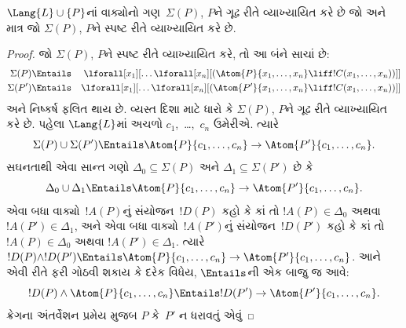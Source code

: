 \begin{thm}[બેથનું વ્યાખ્યેયતા પ્રમેય]
$\Lang{L}\cup\{P\}$નાં વાક્યોનો ગણ~$\Sigma(P)$, $P$ને ગૂઢ
રીતે વ્યાખ્યાયિત કરે છે જો અને માત્ર જો $\Sigma(P)$, $P$ને સ્પષ્ટ
રીતે વ્યાખ્યાયિત કરે છે.
\end{thm}

\begin{proof}
જો $\Sigma(P)$, $P$ને સ્પષ્ટ રીતે વ્યાખ્યાયિત કરે, તો આ બંને સાચાં
છે:
\begin{align*}
  \Sigma(P) & \Entails & \lforall[x_1][\dots \lforall[x_n]
    [(\Atom{P}{x_1,\dots, x_n} \liff !C(x_1,\dots,x_n))]]\\
  \Sigma(P') & \Entails & \lforall[x_1][\dots \lforall[x_n]
    [(\Atom{P'}{x_1,\dots, x_n} \liff !C(x_1,\dots,x_n))]]
\end{align*}
અને નિષ્કર્ષ ફલિત થાય છે. વ્યસ્ત દિશા માટે ધારો કે $\Sigma(P)$,
$P$ને ગૂઢ રીતે વ્યાખ્યાયિત કરે છે. પહેલા $\Lang{L}$માં અચળો
$c_1$,~\dots,~$c_n$ ઉમેરીએ. ત્યારે
\[
\Sigma(P) \cup \Sigma(P') \Entails
\Atom{P}{c_1, \dots, c_n} \to \Atom{P'}{c_1, \dots, c_n}.
\]
સઘનતાથી એવા સાન્ત ગણો $\Delta_0\subseteq\Sigma(P)$ અને
$\Delta_1\subseteq\Sigma(P')$ છે કે
\[
\Delta_0 \cup \Delta_1 \Entails
\Atom{P}{c_1, \dots, c_n} \to \Atom{P'}{c_1, \dots, c_n}.
\]
એવા બધા વાક્યો~$!A(P)$નું સંયોજન~$!D(P)$ કહો કે કાં તો
$!A(P)\in\Delta_0$ અથવા $!A(P')\in\Delta_1$, અને એવા બધા
વાક્યો~$!A(P')$નું સંયોજન~$!D(P')$ કહો કે કાં તો
$!A(P)\in\Delta_0$ અથવા $!A(P')\in\Delta_1$. ત્યારે
$!D(P)\land !D(P')\Entails\Atom{P}{c_1,\dots,c_n}\to
\Atom{P'}{c_1,\dots,c_n}$. આને એવી રીતે ફરી ગોઠવી શકાય કે દરેક
વિધેય, $\Entails$ની એક બાજુ જ આવે:
\[
!D(P) \land \Atom{P}{c_1, \dots, c_n} \Entails
!D(P') \to \Atom{P'}{c_1, \dots, c_n}.
\]
ક્રેગના અંતર્વેશન પ્રમેય મુજબ $P$ કે~$P'$ ન ધરાવતું એવું

\end{proof}
